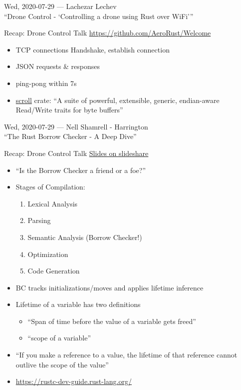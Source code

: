 \documentclass{beamer}
\begin{document}
\begin{frame}[standout]
  Wed, 2020-07-29 --- Lachezar Lechev \\
  \enquote{Drone Control - \enquote{Controlling a drone using Rust over WiFi}}
\end{frame}

\begin{frame}[fragile]{Recap: Drone Control Talk}
  \url{https://github.com/AeroRust/Welcome}
  \begin{itemize}
    \item TCP connections {Handshake, establish connection}
    \item JSON requests \& responses
    \item ping-pong within 7s
    \item \href{https://crates.io/crates/scroll}{scroll} crate: \enquote{A suite of powerful, extensible, generic, endian-aware Read/Write traits for byte buffers}
  \end{itemize}
\end{frame}

\begin{frame}[standout]
  Wed, 2020-07-29 --- Nell Shamrell - Harrington \\
  \enquote{The Rust Borrow Checker - A Deep Dive}
\end{frame}

\begin{frame}[fragile]{Recap: Drone Control Talk}
  \href{https://www.slideshare.net/NellShamrell/the-rust-borrow-checker}{Slides on slideshare}
  \begin{itemize}
    \item \enquote{Is the Borrow Checker a friend or a foe?}
    \item Stages of Compilation:
      \begin{enumerate}
        \item Lexical Analysis
        \item Parsing
        \item Semantic Analysis (Borrow Checker!)
        \item Optimization
        \item Code Generation
      \end{enumerate}
    \item BC tracks initializations/moves and applies lifetime inference
    \item Lifetime of a variable has two definitions
      \begin{itemize}
        \item \enquote{Span of time before the value of a variable gets freed}
        \item \enquote{scope of a variable}
      \end{itemize}
    \item \enquote{If you make a reference to a value, the lifetime of that reference cannot outlive the scope of the value}
    \item \url{https://rustc-dev-guide.rust-lang.org/}
  \end{itemize}
\end{frame}
\end{document}
